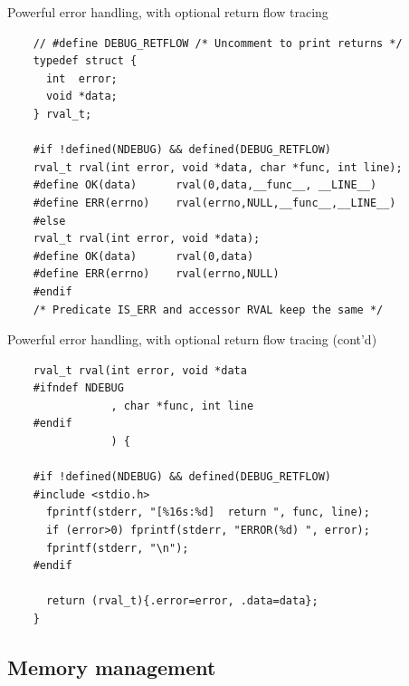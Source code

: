 \begin{frame}[fragile]{Powerful error handling, with optional return flow tracing}

  \begin{lstlisting}
    // #define DEBUG_RETFLOW /* Uncomment to print returns */
    typedef struct {
      int  error;
      void *data;
    } rval_t;
    
    #if !defined(NDEBUG) && defined(DEBUG_RETFLOW)
    rval_t rval(int error, void *data, char *func, int line);
    #define OK(data)      rval(0,data,__func__, __LINE__)
    #define ERR(errno)    rval(errno,NULL,__func__,__LINE__)
    #else
    rval_t rval(int error, void *data);
    #define OK(data)      rval(0,data)
    #define ERR(errno)    rval(errno,NULL)
    #endif
    /* Predicate IS_ERR and accessor RVAL keep the same */
  \end{lstlisting}

\end{frame}


\begin{frame}[fragile]{Powerful error handling, with optional return flow tracing (cont'd)}

  \begin{lstlisting}
    rval_t rval(int error, void *data
    #ifndef NDEBUG
                , char *func, int line
    #endif
                ) {
      
    #if !defined(NDEBUG) && defined(DEBUG_RETFLOW)
    #include <stdio.h>
      fprintf(stderr, "[%16s:%d]  return ", func, line);
      if (error>0) fprintf(stderr, "ERROR(%d) ", error);
      fprintf(stderr, "\n");
    #endif

      return (rval_t){.error=error, .data=data};
    }
  \end{lstlisting}

\end{frame}


\subsection{Memory management}

